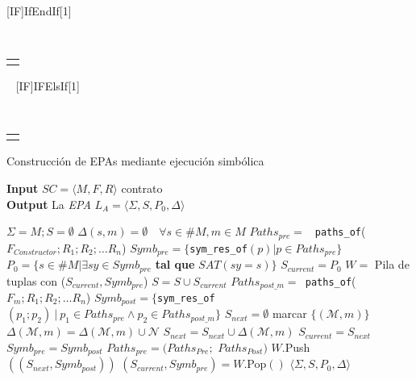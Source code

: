 \newcommand\CONDITION[2]%
{\begin{tabular}[t]{@{}l@{}}#1#2\end{tabular}}
[IF]{If}{EndIf}[1]%
{\algorithmicif\ \CONDITION{#1}{\ \algorithmicthen}}%
{\algorithmicend\ \algorithmicif}
[IF]{IF}{ElsIf}[1]%
{\algorithmicelse\ \algorithmicif\ \CONDITION{#1}{\ \algorithmicthen}}
\begin{algorithm}
    \captionsetup{belowskip=0pt}
    \caption{Construcción de EPAs mediante ejecución simbólica}\label{alg:alternativo}
    \hspace*{\algorithmicindent} \textbf{Input} $SC = \langle M, F, R \rangle$ contrato \\
    \hspace*{\algorithmicindent} \textbf{Output} La \textit{EPA} $L_A =\langle \Sigma, S, P_0, \Delta \rangle$
    \begin{algorithmic}[1]
        \State $\Sigma = M; S = \emptyset$
        \State $\Delta(s,m) = \emptyset \quad \forall s \in \#M, m \in M$
        \State $Paths_{pre} = $ \texttt{ paths\_of}($F_{Constructor};R_1;R_2; \dots R_n$)
        \State $Symb_{pre} = \{$\texttt{sym\_res\_of}$(p) | p \in Paths_{pre} \}$
        \State $P_0 = \{s \in \#M | \exists sy \in Symb_{pre}$ \textbf{tal que} $SAT(sy= s)\}$
        \State $S_{current } = P_0$
        \State $W =$ Pila de tuplas con ($S_{current},Symb_{pre}$)
        \State $S = S \cup S_{current}$
        \State $Paths_{post\_m} = $\texttt{ paths\_of}($F_m;R_1;R_2; \dots R_n$)
        \State $Symb_{post} =  \{$\texttt{sym\_res\_of}$(p_1;p_2) \:|\: p_1 \in Paths_{pre} \land p_2 \in Paths_{post\_m} \} $
        \State $S_{next} = \emptyset$
        \State marcar $\{(\mathcal{M},m)\}$
        \State $\Delta(\mathcal{M},m) = \Delta(\mathcal{M},m) \cup \mathcal{N} $
        \EndIf
        \EndFor
        \State $S_{next} = S_{next} \cup \Delta(\mathcal{M},m)$
        \EndFor
        \State $S_{current } = S_{next}$
        \State $Symb_{pre} = Symb_{post}$
        \State $Paths_{pre} = (Paths_{Pre};$ $Paths_{Post})$
        \State $W.$Push$((S_{next},Symb_{post}))$
        \Else
        \State $(S_{current },Symb_{pre}) = W.$Pop$()$
        \EndIf
        \EndWhile
        \State \Return $\langle \Sigma, S, P_0, \Delta \rangle$
    \end{algorithmic}
\end{algorithm}